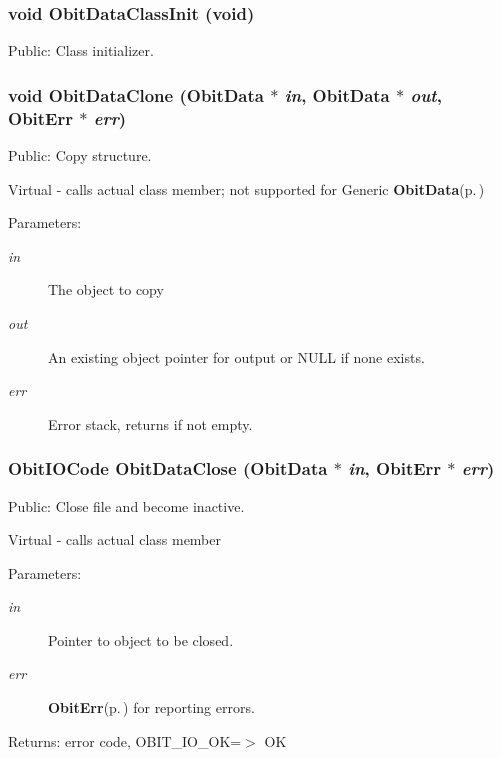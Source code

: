 \subsubsection{\setlength{\rightskip}{0pt plus 5cm}void Obit\-Data\-Class\-Init (void)}\label{ObitData_8h_a26}


Public: Class initializer. 

\subsubsection{\setlength{\rightskip}{0pt plus 5cm}void Obit\-Data\-Clone ({\bf Obit\-Data} $\ast$ {\em in}, {\bf Obit\-Data} $\ast$ {\em out}, {\bf Obit\-Err} $\ast$ {\em err})}\label{ObitData_8h_a35}


Public: Copy structure. 

Virtual - calls actual class member; not supported for Generic {\bf Obit\-Data}{\rm (p.\,\pageref{structObitData})} \begin{Desc}
\item[Parameters:]
\begin{description}
\item[{\em in}]The object to copy \item[{\em out}]An existing object pointer for output or NULL if none exists. \item[{\em err}]Error stack, returns if not empty. \end{description}
\end{Desc}
\subsubsection{\setlength{\rightskip}{0pt plus 5cm}Obit\-IOCode Obit\-Data\-Close ({\bf Obit\-Data} $\ast$ {\em in}, {\bf Obit\-Err} $\ast$ {\em err})}\label{ObitData_8h_a39}


Public: Close file and become inactive. 

Virtual - calls actual class member \begin{Desc}
\item[Parameters:]
\begin{description}
\item[{\em in}]Pointer to object to be closed. \item[{\em err}]{\bf Obit\-Err}{\rm (p.\,\pageref{structObitErr})} for reporting errors. \end{description}
\end{Desc}
\begin{Desc}
\item[Returns:]error code, OBIT\_\-IO\_\-OK=$>$ OK \end{Desc}
